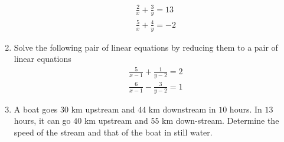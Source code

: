 \documentclass{article}
\theoremstyle{remark}
\begin{document}
\begin{enumerate}
\begin{align}
\frac{2}{x}+\frac{3}{y}= 13 \\ \frac{5}{x}+\frac{4}{y} = -2
\end{align}
\item Solve the following pair of linear equations by reducing them to a pair of linear equations
\begin{align}
\frac{5}{x-1}+\frac{1}{y-2}= 2 \\ \frac{6}{x-1}-\frac{3}{y-2}= 1
\end{align}
\item A boat goes $30$ km upstream and $44$ km downstream in $10$ hours. In $13$ hours, it can go $40$ km upstream and $55$ km down-stream. Determine the speed of the stream and that of the boat in still water.
\end{enumerate}
\end{document}

